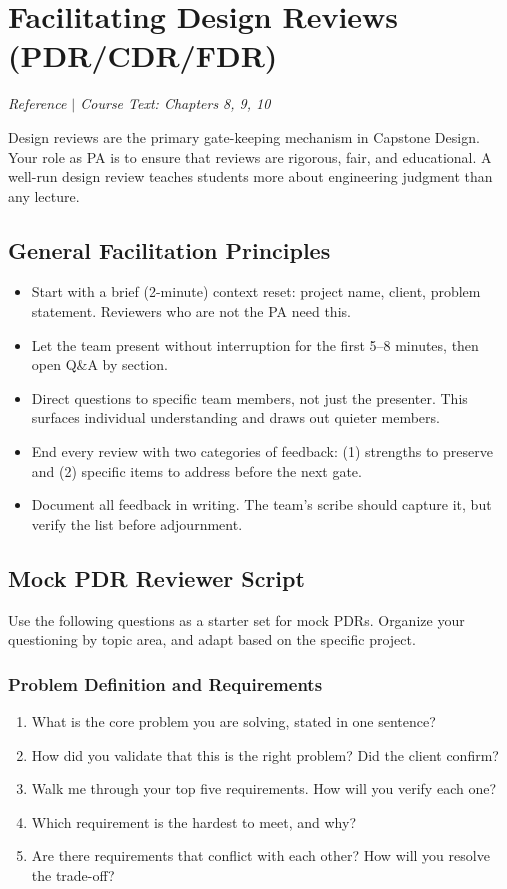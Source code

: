 \section{Facilitating Design Reviews (PDR/CDR/FDR)}
\textit{Reference $|$ Course Text: Chapters 8, 9, 10}

Design reviews are the primary gate-keeping mechanism in Capstone Design. Your role as PA is to ensure that reviews are rigorous, fair, and educational. A well-run design review teaches students more about engineering judgment than any lecture.

\subsection{General Facilitation Principles}

\begin{bestpractice}
\begin{itemize}[nosep,leftmargin=1.5em]
\item Start with a brief (2-minute) context reset: project name, client, problem statement. Reviewers who are not the PA need this.
\item Let the team present without interruption for the first 5--8 minutes, then open Q\&A by section.
\item Direct questions to specific team members, not just the presenter. This surfaces individual understanding and draws out quieter members.
\item End every review with two categories of feedback: (1) strengths to preserve and (2) specific items to address before the next gate.
\item Document all feedback in writing. The team's scribe should capture it, but verify the list before adjournment.
\end{itemize}
\end{bestpractice}

\subsection{Mock PDR Reviewer Script}

Use the following questions as a starter set for mock PDRs. Organize your questioning by topic area, and adapt based on the specific project.

\subsubsection*{Problem Definition and Requirements}
\begin{enumerate}[nosep,leftmargin=1.5em]
\item What is the core problem you are solving, stated in one sentence?
\item How did you validate that this is the right problem? Did the client confirm?
\item Walk me through your top five requirements. How will you verify each one?
\item Which requirement is the hardest to meet, and why?
\item Are there requirements that conflict with each other? How will you resolve the trade-off?
\end{enumerate}

